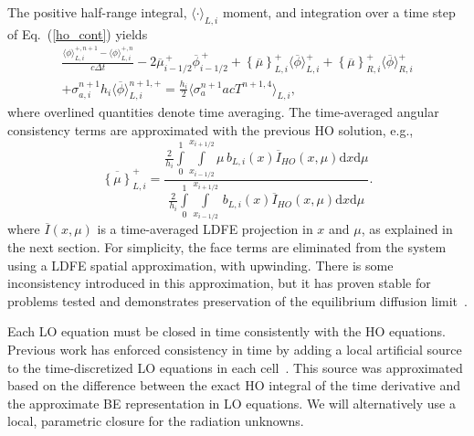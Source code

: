 \documentclass{anstrans}
\renewcommand{\eqref}[1]{(\ref{#1})}
\renewcommand{\d}{\mathrm{d}}
\newcommand{\mom}[1]{\langle #1 \rangle}
\newcommand{\xl}{{x_{i-1/2}}}
\newcommand{\xr}{{x_{i+1/2}}}
\newcommand{\phibar}{\ensuremath{\overline{\phi}}}
\newcommand{\cur}[1]{\left\{ #1 \right\}}
\begin{document}
The positive half-range integral, $\mom{\cdot}_{L,i}$ moment, and
integration over a time step of Eq.~\eqref{ho_cont} yields
\begin{multline}\label{eq:t_moml_ex}
    \frac{\mom{\phi}_{L,i}^{+,n+1} - \mom{\phi}_{L,i}^{+,n}}{c \Delta t}
    -2\overline {\mu}_{i-1/2}^{\,+} \overline \phi_{i-1/2}^{\,+} + {\cur {\overline\mu}}_{L,i}^{+}
  \mom{\phibar}_{L,i}^{+}
  +  \cur{\overline\mu}_{R,i}^{+}
  \mom{\phibar}_{R,i}^{+} \\ +  \sigma_{a,i}^{n+1} h_i 
  \mom{\overline\phi}_{L,i}^{n+1,+}   = \frac{h_i}{2} \mom{\sigma_a^{n+1} a c T^{n+1,4}}_{L,i},
\end{multline}
where overlined quantities denote time averaging.  The time-averaged angular consistency
terms are approximated with the previous HO solution, e.g.,
\begin{equation}\label{const}
    \overline{\cur{{\mu}}}_{L,i}^+ =  \frac{
        {\displaystyle \frac{2}{h_i}} \int\limits_0^1 \int\limits_\xl^\xr \mu \, b_{L,i}(x)
        \overline{I}_{HO}(x,\mu) \d x \d \mu } 
{{\displaystyle \frac{2}{h_i}} \int\limits_0^1 \int\limits_\xl^\xr \, b_{L,i}(x)
\overline{I}_{HO}(x,\mu) \d x \d \mu } .
\end{equation}
where $\overline{I}(x,\mu)$ is a time-averaged LDFE projection in $x$ and $\mu$, as
explained in the next section.  For simplicity, the face terms are eliminated from the system using a LDFE
spatial approximation, with upwinding.  There is some inconsistency introduced in this approximation, but
it has proven stable for problems tested and demonstrates preservation of the equilibrium diffusion
limit~\cite{morel_ldtrt}.

Each LO equation must be closed in time consistently with the HO
equations.   Previous work has enforced
consistency in time by adding a local artificial source to the time-discretized LO
equations in each cell~\cite{holo_rh}.  This
source was approximated based on the difference between the exact HO integral of the time
derivative and the approximate BE representation in LO equations. We will alternatively use a
local, parametric closure for the radiation unknowns. 
\end{document}
